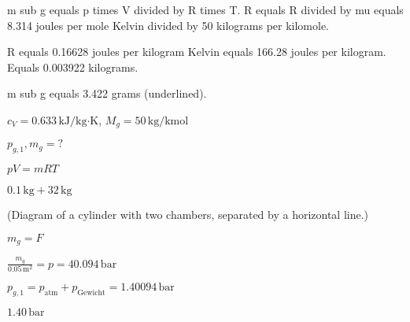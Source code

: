 m sub g equals p times V divided by R times T.  
R equals R divided by mu equals 8.314 joules per mole Kelvin divided by 50 kilograms per kilomole.  

R equals 0.16628 joules per kilogram Kelvin equals 166.28 joules per kilogram.  
Equals 0.003922 kilograms.  

m sub g equals 3.422 grams (underlined).

\( c_V = 0.633 \, \text{kJ/kg·K} \), \( M_g = 50 \, \text{kg/kmol} \)  

\( p_{g,1}, m_g = ? \)  

\( pV = mRT \)  

\( 0.1 \, \text{kg} + 32 \, \text{kg} \)  

(Diagram of a cylinder with two chambers, separated by a horizontal line.)  

\( m_g = F \)  

\( \frac{m_g}{0.05 \, \text{m}^2} = p = 40.094 \, \text{bar} \)  

\( p_{g,1} = p_{\text{atm}} + p_{\text{Gewicht}} = 1.40094 \, \text{bar} \)  

\( 1.40 \, \text{bar} \)